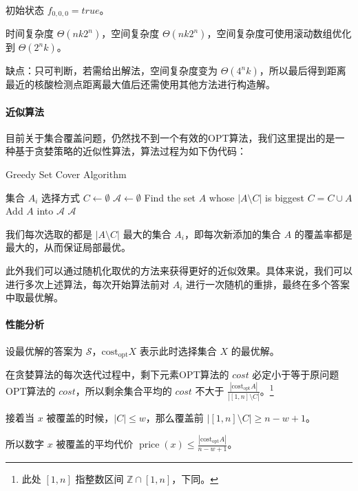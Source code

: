 \documentclass{cumcmthesis}
\begin{document}
初始状态 $f_{0,0,0} = true$。

时间复杂度 $\Theta(nk2^n)$，空间复杂度 $\Theta(nk2^n)$，空间复杂度可使用滚动数组优化到 $\Theta(2^nk)$。

缺点：只可判断，若需给出解法，空间复杂度变为 $\Theta(4^nk)$，所以最后得到距离最近的核酸检测点距离最大值后还需使用其他方法进行构造解。

\paragraph{近似算法}

目前关于集合覆盖问题，仍然找不到一个有效的OPT算法，我们这里提出的是一种基于贪婪策略的近似性算法，算法过程为如下伪代码：

\begin{algorithm}
    \caption{Greedy Set Cover Algorithm}
    \begin{algorithmic}[1]
        \Require 集合 $A_i$
        \Ensure 选择方式
        \State $C \gets \emptyset$
        \State $\mathscr{A} \gets \emptyset$
            \State Find the set $A$ whose $|A\setminus C|$ is biggest
            \State $C = C \cup A$
            \State Add $A$ into $\mathscr{A}$
        \EndWhile
        \State \Return $\mathscr{A}$
    \end{algorithmic}
\end{algorithm}

我们每次选取的都是 $|A\setminus C|$ 最大的集合 $A_i$，即每次新添加的集合 $A$ 的覆盖率都是最大的，从而保证局部最优。

此外我们可以通过随机化取优的方法来获得更好的近似效果。具体来说，我们可以进行多次上述算法，每次开始算法前对 $A_i$ 进行一次随机的重排，最终在多个答案中取最优解。

\paragraph{性能分析}

设最优解的答案为 $\mathscr{S}$，$\operatorname{cost_{opt}}X$ 表示此时选择集合 $X$ 的最优解。

在贪婪算法的每次迭代过程中，剩下元素OPT算法的 $cost$ 必定小于等于原问题OPT算法的 $cost$，所以剩余集合平均的 $cost$ 不大于 $\frac{|\operatorname{cost_{opt}}A|}{|[1,n]\setminus C|}$。\footnote{此处 $[1,n]$ 指整数区间 $\mathbb{Z}\cap[1,n]$，下同。}

接着当 $x$ 被覆盖的时候，$|C| \le w$，那么覆盖前 $|[1,n]\setminus C| \ge n - w + 1$。

所以数字 $x$ 被覆盖的平均代价 $\operatorname{price}(x) \le \frac{|\operatorname{cost_{opt}}A|}{n-w+1}$。
\end{document}
